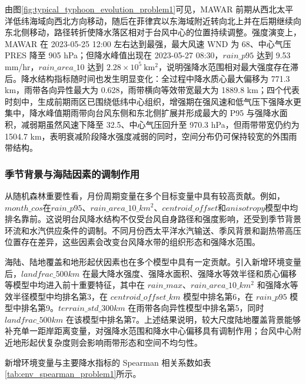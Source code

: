 \documentclass[UTF8,a4paper,zihao=5,fontset=fandol]{ctexart}
\numberwithin{equation}{section}
\numberwithin{figure}{section}
\numberwithin{table}{section}
\begin{document}
由图\ref{fig:typical_typhoon_evolution_problem1}可见，MAWAR 前期从西北太平洋低纬海域向西北方向移动，随后在菲律宾以东海域附近转向北上并在后期继续向东北侧移动，路径转折使降水落区相对于台风中心的位置持续调整。强度演变上，MAWAR 在 2023-05-25 12:00 左右达到最强，最大风速 WND 为 68、中心气压 PRES 降至 905 hPa；但降水峰值出现在 2023-05-27 08:30，$rain\_p95$ 达到 9.53 mm/hr，$rain\_area\_10$ 达到 $2.28\times10^5\ \mathrm{km^2}$，说明强降水范围相对最大强度存在滞后。降水结构指标随时间也发生明显变化：全过程中降水质心最大偏移为 771.3 km，雨带各向异性最大为 0.628，雨带横向等效带宽最大为 1889.8 km；四个代表时刻中，生成前期雨区已围绕低纬中心组织，增强期在强风速和低气压下强降水更集中，降水峰值期雨带向台风东侧和东北侧扩展并形成最大的 P95 与强降水面积，减弱期虽然风速下降至 32.5、中心气压回升至 970.3 hPa，但雨带带宽仍约为 1504.7 km，表明衰减阶段降水强度减弱的同时，空间分布仍可保持较宽的外围雨带结构。

\subsubsection{季节背景与海陆因素的调制作用}

从随机森林重要性看，月份周期变量在多个目标变量中具有较高贡献。例如，$month\_cos$在$rain\_p95$、$rain\_area\_10\_km^2$、$centroid\_offset$和$anisotropy$模型中均排名靠前。这说明台风降水结构不仅受台风自身路径和强度影响，还受到季节背景环流和水汽供应条件的调制。不同月份西太平洋水汽输送、季风背景和副热带高压位置存在差异，这些因素会改变台风降水带的组织形态和强降水范围。

海陆、陆地覆盖和地形起伏因素也在多个模型中具有一定贡献。引入新增环境变量后，$landfrac\_500km$ 在最大降水强度、强降水面积、强降水等效半径和质心偏移等模型中均进入前十重要特征，其中在 $rain\_max$、$rain\_area\_10\_km^2$ 和强降水等效半径模型中均排名第3，在 $centroid\_offset\_km$ 模型中排名第6，在 $rain\_p95$ 模型中排名第9。$terrain\_std\_300km$ 在雨带各向异性模型中排名第5，同时 $landfrac\_500km$ 在该模型中排名第7。上述结果说明，较大尺度陆地覆盖背景能够补充单一距岸距离变量，对强降水范围和降水中心偏移具有调制作用；台风中心附近地形起伏复杂度则会影响雨带形态和空间不均匀性。

新增环境变量与主要降水指标的 Spearman 相关系数如表\ref{tab:env_spearman_problem1}所示。
\end{document}
